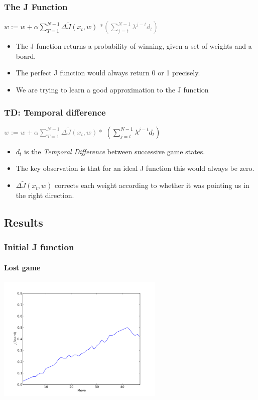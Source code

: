 \documentclass[10pt]{beamer}
\begin{document}
    \begin{frame}
      \frametitle{The J Function}
      \begin{center} $\displaystyle w := w + \alpha \sum_{T=1}^{N-1} \Delta \tilde{J}(x_t,w)$  \textcolor{gray}{$ * ( \sum _{j=t} ^{N-1} \lambda ^{j-t} d_t )$} \end{center}
      \begin{itemize}
        \item<1-> The J function returns a probability of winning, given a set of weights and a board.
        \item<1-> The perfect J function would always return 0 or 1 precisely.
        \item<1-> We are trying to learn a good approximation to the J function
      \end{itemize}
    \end{frame}
    
    \begin{frame}
      \frametitle{TD: Temporal difference}
      \begin{center} \textcolor{gray}{$\displaystyle w := w + \alpha \sum_{T=1}^{N-1} \Delta \tilde{J}(x_t,w) *$}  $( \sum _{j=t} ^{N-1} \lambda ^{j-t} d_t )$ \end{center}
      \begin{itemize}
        \item<1-> $d_t$ is the \emph{Temporal Difference} between successive game states.
        \item<1-> The key observation is that for an ideal J function this would always be zero.
        \item<1-> $\Delta \tilde{J}(x_t,w)$ corrects each weight according to whether it was pointing us in the right direction.
      \end{itemize}
    \end{frame}

\subsection{Results}



\begin{frame}
  \frametitle{Initial J function}
  \framesubtitle{Lost game}
  \begin{center} \includegraphics[height=6cm]{Graphs/J_1iteration_lost.pdf} \end{center}
\end{frame}
\end{document}
